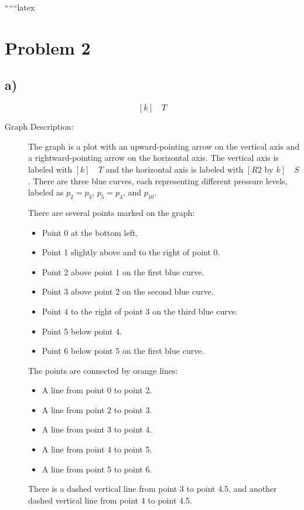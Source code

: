 
``````latex


\section*{Problem 2}
\subsection*{a)}
\[
[k] \quad T
\]

\begin{description}
    \item[Graph Description:] 
    The graph is a plot with an upward-pointing arrow on the vertical axis and a rightward-pointing arrow on the horizontal axis. The vertical axis is labeled with $[k] \quad T$ and the horizontal axis is labeled with $[R2 \text{ by } k] \quad S$. There are three blue curves, each representing different pressure levels, labeled as $p_2 = p_3$, $p_5 = p_4$, and $p_{10}$. 

    There are several points marked on the graph:
    \begin{itemize}
        \item Point 0 at the bottom left.
        \item Point 1 slightly above and to the right of point 0.
        \item Point 2 above point 1 on the first blue curve.
        \item Point 3 above point 2 on the second blue curve.
        \item Point 4 to the right of point 3 on the third blue curve.
        \item Point 5 below point 4.
        \item Point 6 below point 5 on the first blue curve.
    \end{itemize}
    
    The points are connected by orange lines:
    \begin{itemize}
        \item A line from point 0 to point 2.
        \item A line from point 2 to point 3.
        \item A line from point 3 to point 4.
        \item A line from point 4 to point 5.
        \item A line from point 5 to point 6.
    \end{itemize}
    
    There is a dashed vertical line from point 3 to point 4.5, and another dashed vertical line from point 4 to point 4.5.
\end{description}

